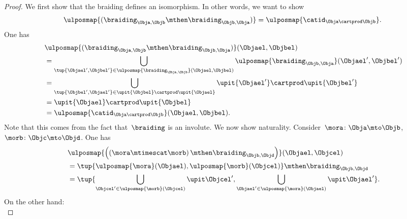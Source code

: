 \begin{proof}
    We first show that the braiding defines an isomorphism.
    In other words, we want to show
    \begin{equation*}
        \ulposmap{(\braiding_{\Obja,\Objb}\mthen \braiding_{\Objb,\Obja})}=\ulposmap{\catid_{\Obja \cartprod \Objb}}.
    \end{equation*}
    One has
    \begin{equation*}
        \begin{aligned}
            ~ & \ulposmap{(\braiding_{\Obja,\Objb}\mthen \braiding_{\Objb,\Obja})}(\Objael,\Objbel)                                                            \\
              & =\bigcup_{\tup{\Objael',\Objbel'}\in \ulposmap{\braiding_{\Obja,\Objb}}(\Objael,\Objbel)}\ulposmap{\braiding_{\Objb,\Obja}}(\Objael',\Objbel') \\
              & =\bigcup_{\tup{\Objbel',\Objael'}\in \upit\{\Objbel\}\cartprod \upit\{\Objael\}}\upit\{ \Objael'\}\cartprod \upit\{ \Objbel'\}                 \\
              & =\upit\{\Objael\} \cartprod \upit\{\Objbel\}                                                                                                   \\
              & =\ulposmap{\catid_{\Obja\cartprod \Objb}}(\Objael,\Objbel).
        \end{aligned}
    \end{equation*}
    Note that this comes from the fact that~$\braiding$ is an involute.
    We now show naturality.
    Consider~$\mora \colon \Obja \mto \Objb$,~$\morb\colon \Objc \mto \Objd$.
    One has
    \begin{equation}
        \label{eq:braid-upos-natural-a}
        \begin{aligned}
            ~ & \ulposmap{\left(\left( \mora \mtimescat \morb\right)\mthen \braiding_{ \Objb, \Objd}\right)}(\Objael,\Objcel)                       \\
              & = \tup{\ulposmap{\mora}(\Objael),\ulposmap{\morb}(\Objcel)}\mthen \braiding_{ \Objb, \Objd}                                         \\
              & =\tup{\bigcup_{\Objcel'\in \ulposmap{\morb}(\Objcel)}\upit \Objcel',\bigcup_{\Objael'\in \ulposmap{\mora}(\Objael)}\upit \Objael'}.
        \end{aligned}
    \end{equation}
    On the other hand:
    \begin{equation}

\end{equation}
\end{proof}
